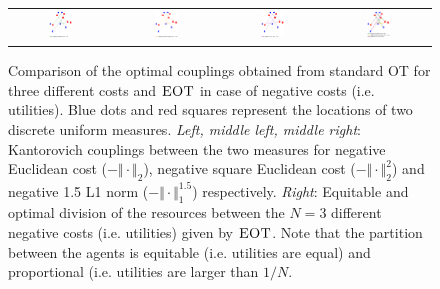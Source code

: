 \begin{figure}[h!]
\begin{tabular}{@{}c@{}c@{}c@{}c@{}}
\includegraphics[width=0.25\textwidth]{sections/appendix/aistats2021_eot/figures/primal_W_1_neg_norm.pdf}&
\includegraphics[width=0.25\textwidth]{sections/appendix/aistats2021_eot/figures/primal_W_2_neg_norm.pdf}&
\includegraphics[width=0.25\textwidth]{sections/appendix/aistats2021_eot/figures/primal_W_3_neg_norm.pdf}&
\includegraphics[width=0.25\textwidth]{sections/appendix/aistats2021_eot/figures/primal_W_1_2_3_neg_norm.pdf}
\end{tabular}
\caption{Comparison of the optimal couplings obtained from standard OT for three different costs and $\MOT$ in case of negative costs (i.e. utilities). Blue dots and red squares represent the locations of two discrete uniform measures. \emph{Left, middle left, middle right}: Kantorovich couplings between the two measures for negative Euclidean cost ($-\Vert\cdot\Vert_2$), negative square Euclidean cost ($-\Vert\cdot\Vert_2^{2}$) and negative 1.5 L1 norm ($-\Vert\cdot\Vert_1^{1.5}$) respectively. \emph{Right}: Equitable and optimal division of the resources between the $N=3$ different negative costs (i.e. utilities) given by $\MOT$.  Note that the partition between the agents is equitable (i.e. utilities are equal) and proportional (i.e. utilities are larger than $1/N$.}
\label{fig-primal-fair-appendix}
\end{figure}



